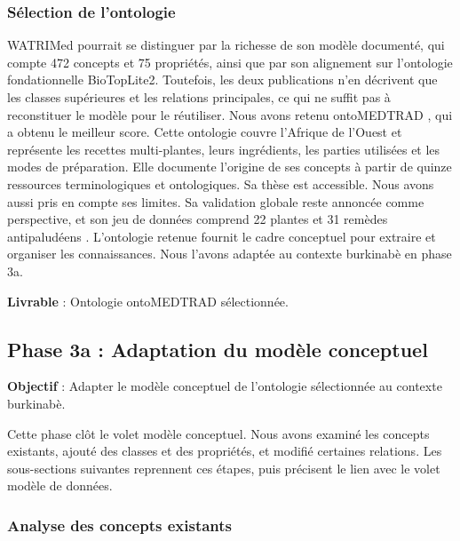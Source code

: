 \subsubsection{Sélection de l'ontologie}

WATRIMed \cite{watrimed2019, watrimed_design_2019} pourrait se distinguer par la richesse de son modèle documenté, qui compte 472 concepts et 75 propriétés, ainsi que par son alignement sur l'ontologie fondationnelle BioTopLite2. Toutefois, les deux publications n'en décrivent que les classes supérieures et les relations principales, ce qui ne suffit pas à reconstituer le modèle pour le réutiliser. Nous avons retenu ontoMEDTRAD \cite{kouame_systeme_2018}, qui a obtenu le meilleur score. Cette ontologie couvre l'Afrique de l'Ouest et représente les recettes multi-plantes, leurs ingrédients, les parties utilisées et les modes de préparation. Elle documente l'origine de ses concepts à partir de quinze ressources terminologiques et ontologiques. Sa thèse est accessible. Nous avons aussi pris en compte ses limites. Sa validation globale reste annoncée comme perspective, et son jeu de données comprend 22 plantes et 31 remèdes antipaludéens \cite{kouame_visual_2020}. L'ontologie retenue fournit le cadre conceptuel pour extraire et organiser les connaissances. Nous l'avons adaptée au contexte burkinabè en phase 3a.

\textbf{Livrable} : Ontologie ontoMEDTRAD sélectionnée.


\subsection{Phase 3a : Adaptation du modèle conceptuel}
\label{subsec:phase3a}

\textbf{Objectif} : Adapter le modèle conceptuel de l'ontologie sélectionnée au contexte burkinabè.

Cette phase clôt le volet modèle conceptuel. Nous avons examiné les concepts existants, ajouté des classes et des propriétés, et modifié certaines relations. Les sous-sections suivantes reprennent ces étapes, puis précisent le lien avec le volet modèle de données.

\subsubsection{Analyse des concepts existants}

